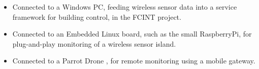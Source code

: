  \begin{itemize} 

\item Connected to a Windows PC, feeding wireless sensor data into a service
framework for building control, in the FCINT project. \cite{fcint}

\item Connected to an Embedded Linux board, such as the small RaspberryPi, for
plug-and-play monitoring of a wireless sensor island.

\item Connected to a Parrot Drone \cite{parrot2012drone}, for remote monitoring
using a mobile gateway. 

\end{itemize}

